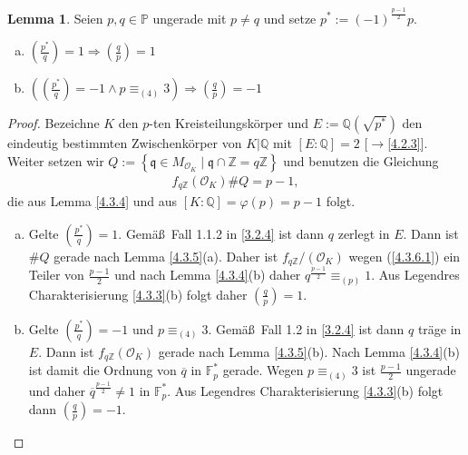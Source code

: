 \documentclass[
twoside=semi,
fontsize=12,
DIV=12, 
cleardoublepage=current,
leqno,
headings=optiontoheadandtoc, 
toc=idx
]{scrbook}
\newcommand{\Z}{\mathbb{Z}}
\newcommand{\Q}{\mathbb{Q}}
\newcommand{\F}{\mathbb{F}}
\renewcommand{\P}{\mathbb{P}}
\newcommand{\brac}[1]{\left( #1 \right)}
\newcommand{\set}[1]{\left\{ #1 \right\}}
\newcommand{\legendre}[2]{\brac{\frac{#1}{#2}}}
\theoremstyle{definition}
\newtheorem{lemma}[definition]{Lemma}
\begin{document}
 	\begin{lemma}\label{4.3.6}\hfill\newline
 		Seien $p, q \in \P$ ungerade mit $p\neq q$ und setze $p^* := (-1)^{\frac{p-1}{2}}p$.
 		\begin{enumerate}[(a)]
 			\item $\displaystyle \legendre{p^*}{q} = 1 \Longrightarrow \legendre{q}{p} = 1$
 			\item $\displaystyle \brac{\legendre{p^*}{q} = -1 \land p \equiv_{(4)} 3} \Longrightarrow \legendre{q}{p} = -1$
 		\end{enumerate}
 	
 		\begin{proof}
 			Bezeichne $K$ den $p$-ten Kreisteilungsk\"orper und $E := \Q(\sqrt{p^*})$ den eindeutig bestimmten Zwischenk\"orper von $K|\Q$ mit
 			$[E:\Q] = 2$ [$\to$\ref{4.2.3}]. Weiter setzen wir $Q:= \set{\mathfrak{q} \in M_{\mathcal{O}_K} \mid \mathfrak{q} \cap \Z = q\Z}$ und benutzen die Gleichung 
 			\begin{align}
 				f_{q\Z}(\mathcal{O}_K)\#Q = p - 1, \label{4.3.6.1}\tag{$*$}
 			\end{align}
 			die aus Lemma \ref{4.3.4} und aus $[K:\Q] = \varphi(p) = p - 1$ folgt.
 			\begin{enumerate}[(a)]
 				\item Gelte $\displaystyle \legendre{p^*}{q} = 1$. Gem\"a\ss\ Fall 1.1.2 in \ref{3.2.4} ist dann $q$ zerlegt in $E$. Dann ist $\#Q$ gerade nach Lemma
 				\ref{4.3.5}(a). Daher ist $f_{q\Z}/(\mathcal{O}_K)$ wegen (\ref{4.3.6.1}) ein Teiler von $\frac{p-1}{2}$ und nach Lemma \ref{4.3.4}(b) daher $q^{\frac{p-1}{2}} \equiv_{(p)} 1$.
 				Aus Legendres Charakterisierung \ref{4.3.3}(b) folgt daher $\displaystyle \legendre{q}{p} = 1$.
 				
 				\item Gelte $\displaystyle \legendre{p^*}{q} = -1$ und $p \equiv_{(4)} 3$. Gem\"a\ss\ Fall 1.2 in \ref{3.2.4} ist dann $q$ tr\"age in $E$. Dann ist $f_{q\Z}(\mathcal{O}_K)$ gerade nach
 				Lemma \ref{4.3.5}(b). Nach Lemma \ref{4.3.4}(b) ist damit die Ordnung von $\overline{q}$ in $\F_p^*$ gerade. Wegen $p \equiv_{(4)} 3$ ist $\frac{p-1}{2}$ ungerade und daher $\overline{q}^{\frac{p-1}{2}} \neq 1$ in $\F_p^*$. Aus Legendres Charakterisierung \ref{4.3.3}(b) folgt dann $\displaystyle \legendre{q}{p} = -1$.
 			\end{enumerate} 
 		\end{proof}
 	\end{lemma}
 
\end{document}
